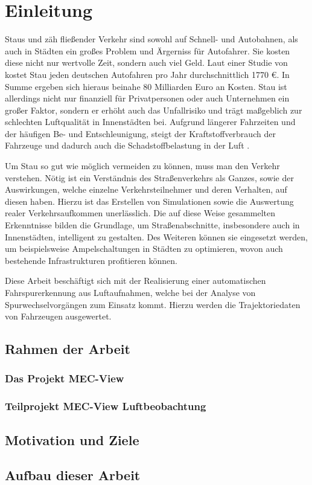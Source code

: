 
\chapter{Einleitung}
\label{cha:introduction}

Staus und zäh fließender Verkehr sind sowohl auf Schnell- und Autobahnen, als auch in Städten ein großes
Problem und Ärgerniss für Autofahrer. Sie kosten diese nicht nur wertvolle Zeit, sondern auch viel Geld.
Laut einer Studie von \cite[]{Cookson} kostet Stau jeden deutschen Autofahren pro Jahr durchschnittlich 1770 €.
In Summe ergeben sich hieraus beinahe 80 Milliarden Euro an Kosten.
Stau ist allerdings nicht nur finanziell für Privatpersonen oder auch Unternehmen ein großer Faktor,
sondern er erhöht auch das Unfallrisiko und trägt maßgeblich zur schlechten Luftqualität in Innenstädten bei.
Aufgrund längerer Fahrzeiten und der häufigen Be- und Entschleunigung, steigt der Kraftstoffverbrauch der
Fahrzeuge und dadurch auch die Schadstoffbelastung in der Luft \cite[]{Hemmerle2016}.

Um Stau so gut wie möglich vermeiden zu können, muss man den Verkehr verstehen. Nötig
ist ein Verständnis des Straßenverkehrs als Ganzes, sowie der Auswirkungen, welche einzelne Verkehrsteilnehmer
und deren Verhalten, auf diesen haben. Hierzu ist das Erstellen von Simulationen sowie die Auswertung
realer Verkehrsaufkommen unerlässlich.
Die auf diese Weise gesammelten Erkenntnisse bilden die Grundlage, um Straßenabschnitte, insbesondere
auch in Innenstädten, intelligent zu gestalten.
Des Weiteren können sie eingesetzt werden, um beispielsweise Ampelschaltungen in Städten zu optimieren,
wovon auch bestehende Infrastrukturen profitieren können.

Diese Arbeit beschäftigt sich mit der Realisierung einer automatischen Fahrspurerkennung aus Luftaufnahmen,
welche bei der Analyse von Spurwechselvorgängen zum Einsatz kommt. Hierzu werden die Trajektoriedaten
von Fahrzeugen ausgewertet.


\section{Rahmen der Arbeit}
\label{sec:rahmen_arbeit}

\subsection{Das Projekt MEC-View}
\label{sec:mec_view}

\subsection{Teilprojekt MEC-View Luftbeobachtung}
\label{sec:mecview_sim}

\section{Motivation und Ziele}
\label{sec:motivation_goals}

\section{Aufbau dieser Arbeit}
\label{sec:aufbau}